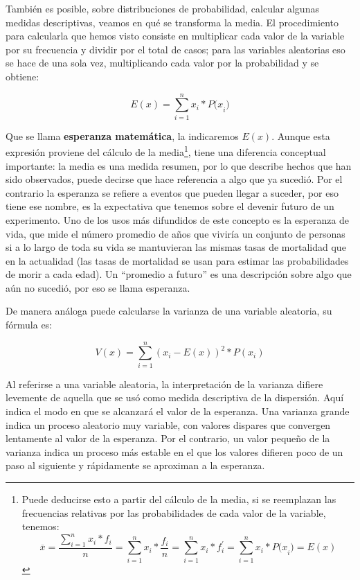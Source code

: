\documentclass[]{book}
\let\rmarkdownfootnote\footnote%
\def\footnote{\protect\rmarkdownfootnote}
\begin{document}
También es posible, sobre distribuciones de probabilidad, calcular
algunas medidas descriptivas, veamos en qué se transforma la media. El
procedimiento para calcularla que hemos visto consiste en multiplicar
cada valor de la variable por su frecuencia y dividir por el total de
casos; para las variables aleatorias eso se hace de una sola vez,
multiplicando cada valor por la probabilidad y se obtiene:

\[E(x) = \sum_{i = 1}^{n}x_{i}*{P(x}_{i})\]

Que se llama \textbf{esperanza matemática}, la indicaremos \(E(x)\). Aunque esta
expresión proviene del cálculo de la media\footnote{Puede deducirse esto a partir del cálculo de la media, si se reemplazan las frecuencias relativas por las probabilidades de cada valor de la variable, tenemos: \[\overline{x} = \frac{\sum_{i = 1}^{n}{x_{i}*f_{i}}}{n} = \sum_{i = 1}^{n}x_{i}*\frac{f_{i}}{n} = \sum_{i = 1}^{n}x_{i}*f_{i}^{'} = \sum_{i = 1}^{n}x_{i}*{P(x}_{i}) = E(x)\]}, tiene una diferencia
conceptual importante: la media es una medida resumen, por lo que
describe hechos que han sido observados, puede decirse que hace
referencia a algo que ya sucedió. Por el contrario la esperanza se
refiere a eventos que pueden llegar a suceder, por eso tiene ese nombre,
es la expectativa que tenemos sobre el devenir futuro de un experimento.
Uno de los usos más difundidos de este concepto es la esperanza de vida,
que mide el número promedio de años que viviría un conjunto de personas
si a lo largo de toda su vida se mantuvieran las mismas tasas de
mortalidad que en la actualidad (las tasas de mortalidad se usan para
estimar las probabilidades de morir a cada edad). Un ``promedio a futuro''
es una descripción sobre algo que aún no sucedió, por eso se llama
esperanza.

De manera análoga puede calcularse la varianza de una variable
aleatoria, su fórmula es:

\[V(x)=\sum_{i=1}^{n}(x_i-E(x))^{2}*P(x_i)\]

Al referirse a una variable aleatoria, la interpretación de la varianza
difiere levemente de aquella que se usó como medida descriptiva de la
dispersión. Aquí indica el modo en que se alcanzará el valor de la
esperanza. Una varianza grande indica un proceso aleatorio muy variable,
con valores dispares que convergen lentamente al valor de la esperanza.
Por el contrario, un valor pequeño de la varianza indica un proceso más
estable en el que los valores difieren poco de un paso al siguiente y
rápidamente se aproximan a la esperanza.
\end{document}
